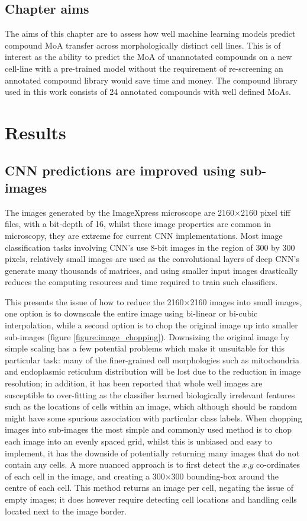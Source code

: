 \documentclass[a4paper,11pt,twoside,openright]{scrbook}
\begin{document}
\subsection{Chapter aims}
The aims of this chapter are to assess how well machine learning models predict compound MoA transfer across morphologically distinct cell lines.
This is of interest as the ability to predict the MoA of unannotated compounds on a new cell-line with a pre-trained model without the requirement of re-screening an annotated compound library would save time and money.
The compound library used in this work consists of 24 annotated compounds with well defined MoAs.



\section{Results}

\subsection{CNN predictions are improved using sub-images}

The images generated by the ImageXpress microscope are 2160$\times$2160 pixel tiff files, with a bit-depth of 16, whilst these image properties are common in microscopy, they are extreme for current CNN implementations.
Most image classification tasks involving CNN's use 8-bit images in the region of 300 by 300 pixels, relatively small images are used as the convolutional layers of deep CNN's generate many thousands of matrices, and using smaller input images drastically reduces the computing resources and time required to train such classifiers.

This presents the issue of how to reduce the 2160$\times$2160 images into small images, one option is to downscale the entire image using bi-linear or bi-cubic interpolation, while a second option is to chop the original image up into smaller sub-images (figure \ref{figure:image_chopping}).
Downsizing the original image by simple scaling has a few potential problems which make it unsuitable for this particular task:
    many of the finer-grained cell morphologies such as mitochondria and endoplasmic reticulum distribution will be lost due to the reduction in image resolution;
    in addition, it has been reported that whole well images are susceptible to over-fitting as the classifier learned biologically irrelevant features such as the locations of cells within an image, which although should be random might have some spurious association with particular class labels.
When chopping images into sub-images the most simple and commonly used method is to chop each image into an evenly spaced grid, whilst this is unbiased and easy to implement, it has the downside of potentially returning many images that do not contain any cells.
A more nuanced approach is to first detect the $x$,$y$ co-ordinates of each cell in the image, and creating a 300$\times$300 bounding-box around the centre of each cell.
This method returns an image per cell, negating the issue of empty images; it does however require detecting cell locations and handling cells located next to the image border.
\end{document}
